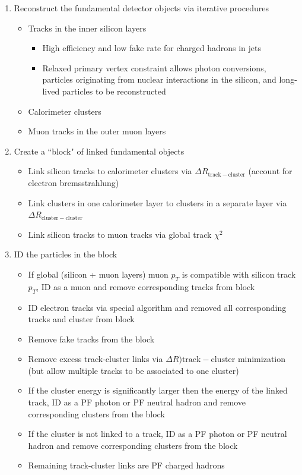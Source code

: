 \documentclass[dissertation.tex]{subfiles}
\begin{document}
\begin{enumerate}
\item Reconstruct the fundamental detector objects via iterative procedures
\begin{itemize}
\item Tracks in the inner silicon layers
\begin{itemize}
\item High efficiency and low fake rate for charged hadrons in jets
\item Relaxed primary vertex constraint allows photon conversions, particles originating from nuclear interactions in the silicon, and long-lived particles to be reconstructed
\end{itemize}
\item Calorimeter clusters
\item Muon tracks in the outer muon layers
\end{itemize}
\item Create a ``block" of linked fundamental objects
\begin{itemize}
\item Link silicon tracks to calorimeter clusters via $\Delta R_{\mathrm{track-cluster}}$ (account for electron bremsstrahlung)
\item Link clusters in one calorimeter layer to clusters in a separate layer via $\Delta R_{\mathrm{cluster-cluster}}$
\item Link silicon tracks to muon tracks via global track $\chi^{2}$
\end{itemize}
\item ID the particles in the block
\begin{itemize}
\item If global (silicon + muon layers) muon $p_{T}$ is compatible with silicon track $p_{T}$, ID as a muon and remove corresponding tracks from block
\item ID electron tracks via special algorithm and removed all corresponding tracks and cluster from block
\item Remove fake tracks from the block
\item Remove excess track-cluster links via $\Delta R){\mathrm{track-cluster}}$ minimization (but allow multiple tracks to be associated to one cluster)
\item If the cluster energy is significantly larger then the energy of the linked track, ID as a PF photon or PF neutral hadron and remove corresponding clusters from the block
\item If the cluster is not linked to a track, ID as a PF photon or PF neutral hadron and remove corresponding clusters from the block
\item Remaining track-cluster links are PF charged hadrons
\end{itemize}
\end{enumerate}
\end{document}
